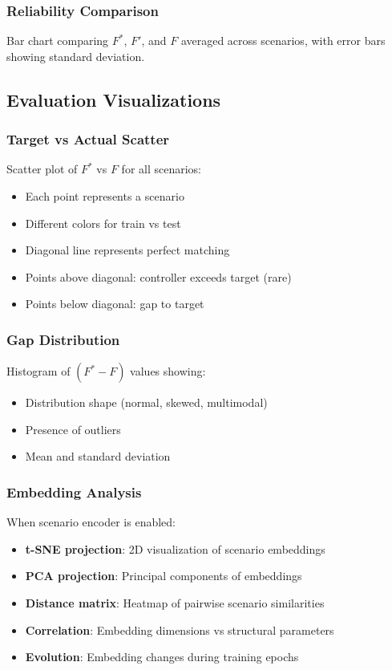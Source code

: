 \documentclass[11pt,a4paper]{article}
\begin{document}
\subsubsection{Reliability Comparison}

Bar chart comparing $F^*$, $F'$, and $F$ averaged across scenarios, with error bars showing standard deviation.

\subsection{Evaluation Visualizations}

\subsubsection{Target vs Actual Scatter}

Scatter plot of $F^*$ vs $F$ for all scenarios:
\begin{itemize}
    \item Each point represents a scenario
    \item Different colors for train vs test
    \item Diagonal line represents perfect matching
    \item Points above diagonal: controller exceeds target (rare)
    \item Points below diagonal: gap to target
\end{itemize}

\subsubsection{Gap Distribution}

Histogram of $(F^* - F)$ values showing:
\begin{itemize}
    \item Distribution shape (normal, skewed, multimodal)
    \item Presence of outliers
    \item Mean and standard deviation
\end{itemize}

\subsubsection{Embedding Analysis}

When scenario encoder is enabled:
\begin{itemize}
    \item \textbf{t-SNE projection}: 2D visualization of scenario embeddings
    \item \textbf{PCA projection}: Principal components of embeddings
    \item \textbf{Distance matrix}: Heatmap of pairwise scenario similarities
    \item \textbf{Correlation}: Embedding dimensions vs structural parameters
    \item \textbf{Evolution}: Embedding changes during training epochs
\end{itemize}
\end{document}
